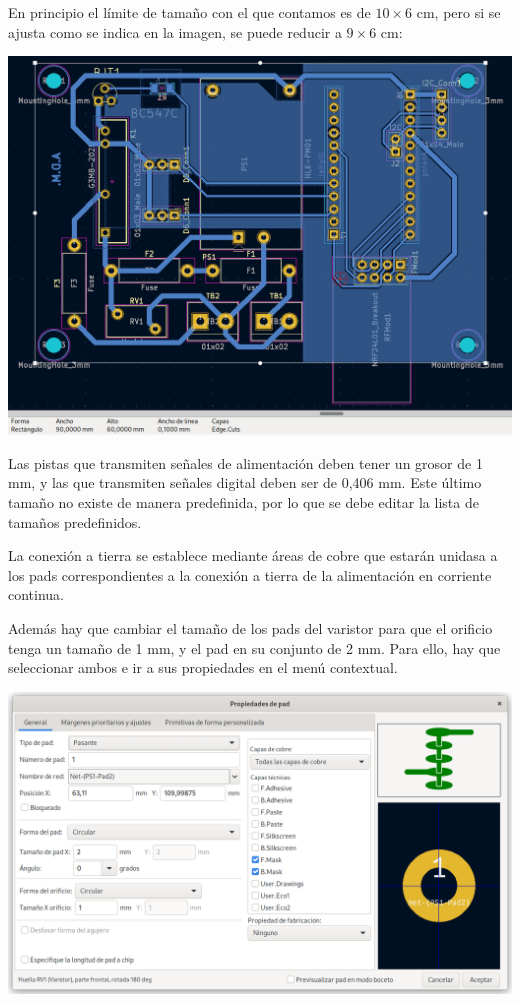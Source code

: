 En principio el límite de tamaño con el que contamos es de $10 \times 6$ cm,
pero si se ajusta como se indica en la imagen, se puede reducir a
$9 \times 6$ cm:

\includegraphics[width=\linewidth]{layout.png}

Las pistas que transmiten señales de alimentación deben tener un grosor de
1 mm, y las que transmiten señales digital deben ser de 0,406 mm. Este último
tamaño no existe de manera predefinida, por lo que se debe editar la lista de
tamaños predefinidos.

La conexión a tierra se establece mediante áreas de cobre que estarán unidasa a
los pads correspondientes a la conexión a tierra de la alimentación en
corriente continua.

Además hay que cambiar el tamaño de los pads del varistor para que el orificio
tenga un tamaño de 1 mm, y el pad en su conjunto de 2 mm. Para ello, hay que
seleccionar ambos e ir a sus propiedades en el menú contextual.

\includegraphics[width=\linewidth]{varistor-pad-hole-size.png}


